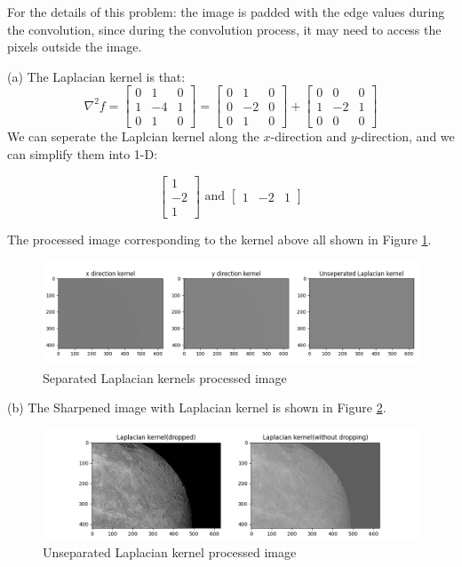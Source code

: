 \problem{}
For the details of this problem: the image is padded with the edge values during the convolution, since during the convolution process, it may need to access the pixels outside the image.

(a) The Laplacian kernel is that:
$$
\nabla^2 f = \begin{bmatrix}
    0 & 1 & 0 \\
    1 & -4 & 1 \\
    0 & 1 & 0
\end{bmatrix}
=
\begin{bmatrix}
    0 & 1 & 0 \\
    0 & -2 & 0 \\
    0 & 1 & 0
\end{bmatrix}
+
\begin{bmatrix}
    0 & 0 & 0 \\
    1 & -2 & 1 \\
    0 & 0 & 0
\end{bmatrix}
$$
We can seperate the Laplcian kernel along the $x$-direction and $y$-direction, and we can simplify them into 1-D:

$$\begin{bmatrix}1\\-2\\1\end{bmatrix} \text{\ \ and \ \ } \begin{bmatrix}1 & -2 & 1\end{bmatrix}$$

The processed image corresponding to the kernel above all shown in Figure \ref{fig:p2a}.\\

\begin{figure}[htbp]
    \centering
	\includegraphics[width=1\textwidth]{../images/p2/p2a.png}
    \caption{Separated Laplacian kernels processed image}
\label{fig:p2a}
\end{figure}


(b) The Sharpened image with Laplacian kernel is shown in Figure \ref{fig:p2b}.\\
\begin{figure}[htbp]
    \centering
    \includegraphics[width=\textwidth]{../images/p2/p2b.png}
    \caption{Unseparated Laplacian kernel processed image}
\label{fig:p2b}
\end{figure}


